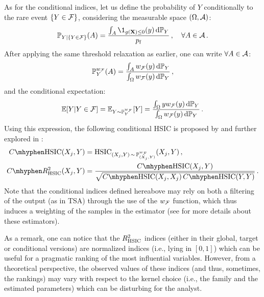 As for the conditional indices, let us define the probability of $Y$ conditionally to the rare event $\{Y \in \mathcal{F}\}$, considering the measurable space $(\Omega, \mathcal{A})$:
\begin{equation}
    \P_{Y|\{Y\in\iF\}}(A) = \frac{\int_{A} \1_{g(\bX)\leq0}(y) \, \dd \P_Y}{\pf}\,, \quad \forall A \in \iA\,.
\end{equation}
After applying the same threshold relaxation as earlier, one can write $\forall A \in \mathcal{A}$: 
\begin{equation}
    \mathbb{P}_Y^{w_{\mathcal{F}}}(A)= \frac{\int_A w_{\mathcal{F}}(y) \, \mathrm{d} \mathbb{P}_Y}{\int_{\Omega} w_{\mathcal{F}}(y) \, \mathrm{d} \mathbb{P}_Y} \, ,
\end{equation}
and the conditional expectation: 
\begin{equation}
    \mathbb{E}[Y|Y \in \mathcal{F}] = \mathbb{E}_{Y\sim\mathbb{P}_Y^{w_{\mathcal{F}}}}[Y] = \frac{\int_\Omega y w_{\mathcal{F}}(y) \, \mathrm{d} \mathbb{P}_Y}{\int_{\Omega} w_{\mathcal{F}}(y) \, \mathrm{d} \mathbb{P}_Y}\, .
\end{equation}
Using this expression, the following conditional HSIC is proposed by \citet{marrel_2018} and further explored in \citet{marrel_chabridon_2021}:
\begin{subequations}
    \begin{align}
        C \mhyphen \HSIC(X_j, Y) & = \HSIC_{(X_j, Y) \,\sim\, \P_{(X_j, Y)}^{w_{\iF}}} (X_j, Y) \, ,\\
        C \mhyphen R^2_{\HSIC}(X_j, Y) &= \frac{C \mhyphen \HSIC(X_j, Y)}{\sqrt{C \mhyphen \HSIC(X_j, X_j) \, C \mhyphen \HSIC(Y, Y)}}\, .
    \end{align}
\end{subequations}
Note that the conditional indices defined hereabove may rely on both a filtering of the output (as in TSA) through the use of the $w_{\mathcal{F}}$ function, which thus induces a weighting of the samples in the estimator (see \citealp{marrel_chabridon_2021} for more details about these estimators).

As a remark, one can notice that the $R^2_{\mathrm{HSIC}}$ indices (either in their global, target or conditional versions) are normalized indices (i.e., lying in $[0,1]$) which can be useful for a pragmatic ranking of the most influential variables. 
However, from a theoretical perspective, the observed values of these indices (and thus, sometimes, the rankings) may vary with respect to the kernel choice (i.e., the family and the estimated parameters) which can be disturbing for the analyst.

